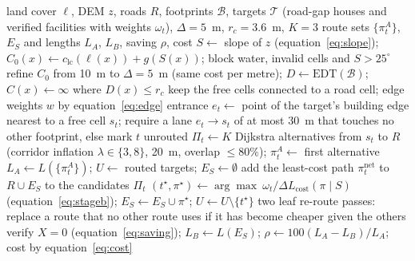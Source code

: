 \documentclass[10pt,a4paper,twocolumn]{article}
\newcommand{\Lcost}{L_{\mathrm{cost}}}
\begin{document}
\begin{algorithm}[htbp]
\footnotesize
\caption{Cost surface with zero-crossing clearance and two-stage routing (\texttt{clearance.py}, \texttt{plan\_network\_v2.py})}
\label{alg:route}
\begin{algorithmic}[1]
\Require land cover $\ell$, DEM $z$, roads $R$, footprints $\mathcal B$, targets $\mathcal T$ (road-gap houses and verified facilities with weights $\omega_t$), $\Delta=5$~m, $r_c=3.6$~m, $K=3$
\Ensure route sets $\{\pi_t^A\}$, $E_S$ and lengths $L_A$, $L_B$, saving $\rho$, cost
\State $S\gets$ slope of $z$ (equation~\ref{eq:slope}); $C_0(x)\gets c_{\mathrm{lc}}(\ell(x))+g(S(x))$; block water, invalid cells and $S>25^{\circ}$
\State refine $C_0$ from 10~m to $\Delta=5$~m (same cost per metre); $D\gets\mathrm{EDT}(\mathcal B)$; $C(x)\gets\infty$ where $D(x)\le r_c$
\State keep the free cells connected to a road cell; edge weights $w$ by equation~\ref{eq:edge}
  \State entrance $e_t\gets$ point of the target's building edge nearest to a free cell $s_t$; require a lane $e_t\to s_t$ of at most 30~m that touches no other footprint, else mark $t$ unrouted
  \State $\Pi_t\gets K$ Dijkstra alternatives from $s_t$ to $R$ (corridor inflation $\lambda\in\{3,8\}$, 20~m, overlap $\le 80\%$); $\pi_t^A\gets$ first alternative
\EndFor
\State $L_A\gets L(\{\pi_t^A\})$; $U\gets$ routed targets; $E_S\gets\emptyset$
   add the least-cost path $\pi_t^{\mathrm{net}}$ to $R\cup E_S$ to the candidates $\Pi_t$ \EndFor
  \State $(t^\star,\pi^\star)\gets\arg\max\ \omega_t/\Delta\Lcost(\pi\mid S)$ (equation~\ref{eq:stageb}); $E_S\gets E_S\cup\pi^\star$; $U\gets U\setminus\{t^\star\}$
\EndWhile
\State two leaf re-route passes: replace a route that no other route uses if it has become cheaper given the others
\State verify $X=0$ (equation~\ref{eq:saving}); $L_B\gets L(E_S)$; $\rho\gets 100(L_A-L_B)/L_A$; cost by equation~\ref{eq:cost}
\end{algorithmic}
\end{algorithm}
\end{document}
